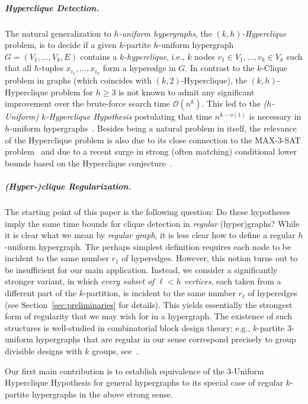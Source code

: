 \documentclass[a4paper,UKenglish,cleveref, autoref, thm-restate,numberwithinsect]{lipics-v2021}
\newcommand{\bigO}{\mathcal{O}}
\begin{document}
\subparagraph*{Hyperclique Detection.}
The natural generalization to \emph{$h$-uniform hypergraphs}, the \emph{$(k, h)$-Hyperclique} problem, is to decide if a given $k$-partite $h$-uniform hypergraph $G = (V_1, \dots, V_k, E)$ contains a \emph{$k$-hyperclique}, i.e., $k$ nodes $v_1 \in V_1, \dots, v_k \in V_k$ such that all $h$-tuples $x_{i_1}, \dots, x_{i_h}$ form a hyperedge in $G$. In contrast to the $k$-Clique problem in graphs (which coincides with $(k, 2)$-Hyperclique), the $(k, h)$-Hyperclique problem for $h \geq 3$ is not known to admit any significant improvement over the brute-force search time $\bigO(n^k)$. This led to the \emph{($h$-Uniform) $k$-Hyperclique Hypothesis} postulating that time $n^{k-o(1)}$ is necessary in $h$-uniform hypergraphs~\cite{LincolnWW18}. Besides being a natural problem in itself, the relevance of the Hyperclique problem is also due to its close connection to the MAX-3-SAT problem~\cite{LincolnWW18} and due to a recent surge in strong (often matching) conditional lower bounds based on the Hyperclique conjecture~\cite{AbboudBDN18,LincolnWW18,BringmannFK19,CarmeliZBKS20,KunnemannM20,AnGIJKN21,BringmannS21,DalirrooyfardW22,Kunnemann22,GorbachevK23,Zamir23}.

\subparagraph*{(Hyper-)clique Regularization.}
The starting point of this paper is the following question: Do these hypotheses imply the same time bounds for clique detection in \emph{regular} (hyper)graphs? While it is clear what we mean by \emph{regular graph}, it is less clear how to define a regular $h$-uniform hypergraph. The perhaps simplest definition requires each node to be incident to the same number $r_1$ of hyperedges. However, this notion turns out to be insufficient for our main application. Instead, we consider a significantly stronger variant, in which \emph{every subset of $\ell<h$ vertices}, each taken from a different part of the $k$-partition, is incident to the same number $r_\ell$ of hyperedges (see Section~\ref{sec:preliminaries} for details). This yields essentially the strongest form of regularity that we may wish for in a hypergraph. The existence of such structures is well-studied in combinatorial block design theory; e.g., $k$-partite $3$-uniform hypergraphs that are regular in our sense correspond precisely to group divisible designs with $k$ groups, see~\cite{ColbournD06}.

Our first main contribution is to establish equivalence of the 3-Uniform Hyperclique Hypothesis for general hypergraphs to its special case of regular $k$-partite hypergraphs in the above strong sense.
\end{document}
